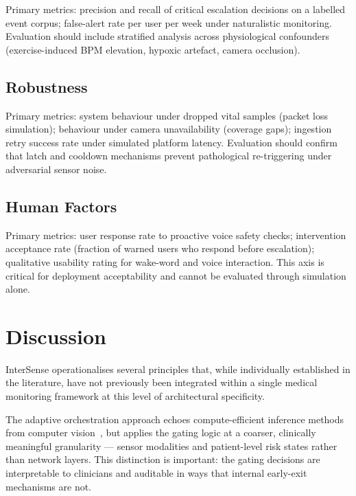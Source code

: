 \documentclass[10pt,twocolumn,a4paper]{article}
\begin{document}
Primary metrics: precision and recall of critical escalation decisions
on a labelled event corpus; false-alert rate per user per week under
naturalistic monitoring.  Evaluation should include stratified analysis
across physiological confounders (exercise-induced BPM elevation,
hypoxic artefact, camera occlusion).

\subsection{Robustness}

Primary metrics: system behaviour under dropped vital samples (packet
loss simulation); behaviour under camera unavailability (coverage
gaps); ingestion retry success rate under simulated platform latency.
Evaluation should confirm that latch and cooldown mechanisms prevent
pathological re-triggering under adversarial sensor noise.

\subsection{Human Factors}

Primary metrics: user response rate to proactive voice safety checks;
intervention acceptance rate (fraction of warned users who respond
before escalation); qualitative usability rating for wake-word and
voice interaction.  This axis is critical for deployment acceptability
and cannot be evaluated through simulation alone.

\section{Discussion}

InterSense operationalises several principles that, while individually
established in the literature, have not previously been integrated
within a single medical monitoring framework at this level of
architectural specificity.

The adaptive orchestration approach echoes compute-efficient inference
methods from computer vision~\cite{teyssedre2022early}, but applies
the gating logic at a coarser, clinically meaningful granularity —
sensor modalities and patient-level risk states rather than network
layers.  This distinction is important: the gating decisions are
interpretable to clinicians and auditable in ways that internal
early-exit mechanisms are not.
\end{document}
